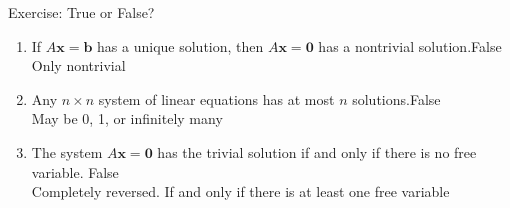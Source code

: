 \begin{frame}{Exercise: True or False?}
  \small
  \begin{enumerate}[start=4]
    \item If $A\mathbf{x}=\mathbf{b}$ has a unique solution, then
          $A\mathbf{x}=\mathbf{0}$ has a nontrivial solution.\pause \alert{False} \\ Only nontrivial
    \item Any $n\times n$ system of linear equations has at most $n$
          solutions.\pause \alert{False} \\ May be 0, 1, or infinitely many
    \item The system $A\mathbf{x}=\mathbf{0}$ has the trivial solution if
          and only if there is no free variable. \pause\alert{False}\\ Completely reversed. If and only if there is at least one free variable
  \end{enumerate}
\end{frame}

    
